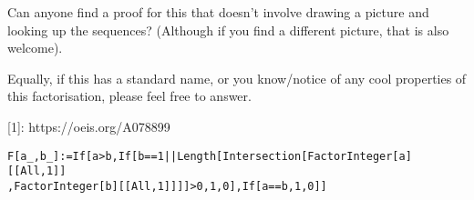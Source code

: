 \documentclass{article}
\begin{document}
Can anyone find a proof for this that doesn't involve drawing a picture and looking up the sequences? (Although if you find a different picture, that is also welcome). 

Equally, if this has a standard name, or you know/notice of any cool properties of this factorisation, please feel free to answer.

 
  [1]: https://oeis.org/A078899

\begin{verbatim}
F[a_,b_]:=If[a>b,If[b==1||Length[Intersection[FactorInteger[a][[All,1]]
,FactorInteger[b][[All,1]]]]>0,1,0],If[a==b,1,0]]
\end{verbatim}



{}

\end{document}
